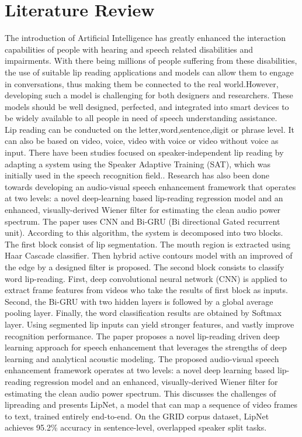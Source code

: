 \chapter{Literature Review}
The introduction of Artificial Intelligence has greatly enhanced the interaction capabilities of people with hearing and speech related disabilities and impairments. With there being millions of people suffering from these disabilities, the use of suitable lip reading applications and models can allow them to engage in conversations, thus making them be connected to the real world.However, developing such a model is challenging for both designers and researchers. These models should be well designed,
perfected, and integrated into smart devices to be widely available to all people in need of speech understanding assistance.
\\Lip reading can be conducted on the letter,word,sentence,digit or phrase level. It can also be based on video, voice, video with voice or video without voice as input. There have been studies focused on speaker-independent lip reading by adapting a system using the Speaker Adaptive Training (SAT), which was initially used in the speech recognition field.\cite{almajai2016improved}. 
Research has also been done towards developing an audio-visual speech enhancement framework that operates at two levels: a novel deep-learning based lip-reading regression model and an enhanced, visually-derived Wiener filter for estimating the clean audio power spectrum.\cite{adeel2019lip}
The paper\cite{miled2023lip} uses CNN and Bi-GRU (Bi directional Gated recurrent unit). According to this algorithm, the system is decomposed into two blocks. The first block consist of lip segmentation. The mouth region is extracted using Haar Cascade classifier. Then hybrid active contours model with an improved of the edge by a designed filter is proposed. The second block consists to classify word lip-reading. First, deep convolutional neural network (CNN) is applied to extract frame features from videos who take the results of first block as inputs. Second, the Bi-GRU with two hidden layers is followed by a global average pooling layer. Finally, the word classification results are obtained by Softmax layer. Using segmented lip inputs can yield stronger features, and vastly improve recognition performance.
The paper\cite{assael2016lipnet} proposes a novel lip-reading driven deep learning approach for speech enhancement that leverages the strengths of deep learning and analytical acoustic modeling. The proposed audio-visual speech enhancement framework operates at two levels: a novel deep learning based lip-reading regression model and an enhanced, visually-derived Wiener filter for estimating the clean audio power spectrum. This  discusses the challenges of lipreading and presents LipNet, a model that can map a sequence of video frames to text, trained entirely end-to-end. On the GRID corpus dataset, LipNet achieves 95.2\% accuracy in sentence-level, overlapped speaker split tasks.

